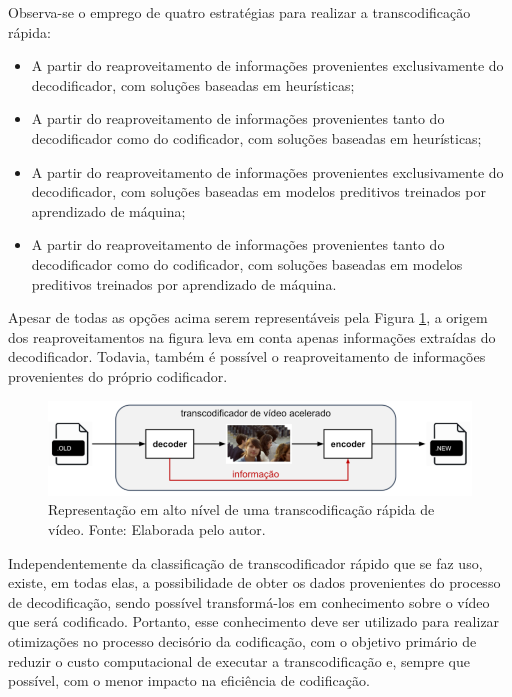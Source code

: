 Observa-se o emprego de quatro estratégias para realizar a transcodificação rápida:

\begin{itemize}
    \item A partir do reaproveitamento de informações provenientes exclusivamente do decodificador, com soluções baseadas em heurísticas;
    
    \item A partir do reaproveitamento de informações provenientes tanto do decodificador como do codificador, com soluções baseadas em heurísticas;

    \item A partir do reaproveitamento de informações provenientes exclusivamente do decodificador, com soluções baseadas em modelos preditivos treinados por aprendizado de máquina;

    \item A partir do reaproveitamento de informações provenientes tanto do decodificador como do codificador, com soluções baseadas em modelos preditivos treinados por aprendizado de máquina.
\end{itemize}

Apesar de todas as opções acima serem representáveis pela Figura \ref{fig:5}, a origem dos reaproveitamentos na figura leva em conta apenas informações extraídas do decodificador. Todavia, também é possível o reaproveitamento de informações provenientes do próprio codificador.

\begin{figure}
    \centering
    \includegraphics[width=\textwidth]{FIGURES/fig_5.png}
    \caption{Representação em alto nível de uma transcodificação rápida de vídeo. Fonte: Elaborada pelo autor.}
    \label{fig:5}
\end{figure}

Independentemente da classificação de transcodificador rápido que se faz uso, existe, em todas elas, a possibilidade de obter os dados provenientes do processo de decodificação, sendo possível transformá-los em conhecimento sobre o vídeo que será codificado. Portanto, esse conhecimento deve ser utilizado para realizar otimizações no processo decisório da codificação, com o objetivo primário de reduzir o custo computacional de executar a transcodificação e, sempre que possível, com o menor impacto na eficiência de codificação.

